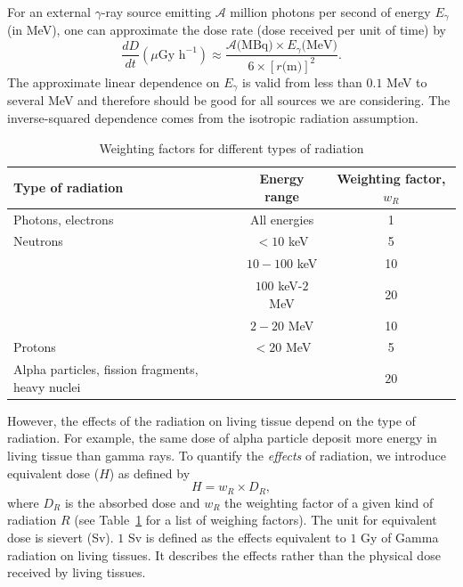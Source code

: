 \documentclass[nofootinbib,preprint,aps]{revtex4-1}
\begin{document}
        For an external $\gamma$-ray source emitting $\mathcal{A}$ million photons per second 
        of energy $E_{\gamma}$
        (in MeV), one can approximate the dose rate (dose received per unit of time) by \cite[chapt. 7]{l01}
        \begin{equation}
            \frac{dD}{dt}(\mu\text{Gy h}^{-1}) \approx \frac{\mathcal{A}\text{(MBq)}\times E_{\gamma}\text{(MeV)}}
            {6\times [r\text{(m)}]^2}.
        \end{equation}
        The approximate linear dependence on $E_{\gamma}$ is valid from less than $0.1$ MeV to several
        MeV and therefore should be good for all sources we are considering.\cite{my68}
        The inverse-squared dependence comes from the isotropic radiation assumption.

        \begin{table}
            \centering
            \caption{Weighting factors for different types of radiation \cite{icrp74}}
            \begin{ruledtabular}
                \begin{tabular}{l c c}
                Type of radiation & Energy range & Weighting factor, $w_R$\\
                \hline
                Photons, electrons & All energies & 1\\
                Neutrons & $<10$ keV & 5 \\
                         & $10-100$ keV & 10 \\
                         & $100$ keV-$2$ MeV & 20 \\
                         & $2-20$ MeV & 10 \\
                Protons & $<20$ MeV & 5 \\
                Alpha particles, fission fragments, heavy nuclei & & $20$\\
            \end{tabular}
            \label{tab:eq}
            \end{ruledtabular}
        \end{table}
        However, the effects of the radiation on living tissue depend on the type of radiation.
        For example, the same dose of alpha particle deposit more energy in living tissue than gamma rays.
        To quantify the {\it effects} of radiation, we introduce equivalent
        dose ($H$) as defined by 
        \begin{equation}
        H=w_R \times D_R,
        \end{equation}
        where $D_R$ is the absorbed dose and $w_R$ the weighting factor of a given kind of radiation $R$
        (see Table~\ref{tab:eq} for a list of weighing factors). The unit for equivalent dose is sievert (Sv).
        $1$ Sv is defined as the effects equivalent to $1$ Gy of Gamma radiation on living tissues. It describes
        the effects rather than the physical dose received by living tissues.
\end{document}
